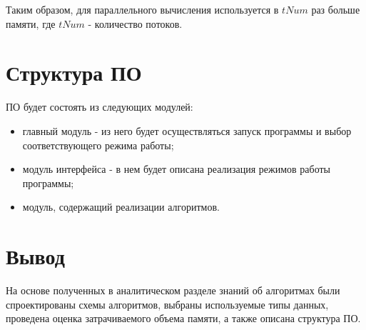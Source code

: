 Таким образом, для параллельного вычисления используется в $tNum$ раз больше памяти, где $tNum$ - количество потоков.

\section{Структура ПО}

ПО будет состоять из следующих модулей:
\begin{itemize}
	\item главный модуль - из него будет осуществляться запуск программы и выбор соответствующего режима работы;
	\item модуль интерфейса - в нем будет описана реализация режимов работы программы;
	\item модуль, содержащий реализации алгоритмов.
\end{itemize}

\section{Вывод}

На основе полученных в аналитическом разделе знаний об алгоритмах были спроектированы схемы алгоритмов, выбраны используемые типы данных, проведена оценка затрачиваемого объема памяти, а также описана структура ПО.